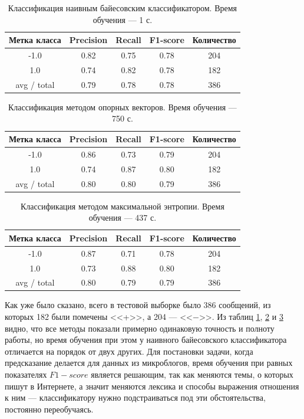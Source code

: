 \begin{table}[h]
    \centering
    \begin{tabular}{|c|c|c|c|c|}
      \hline
      \textbf{Метка класса} & \textbf{Precision} & \textbf{Recall} & \textbf{F1-score} &
      \textbf{Количество} \\ \hline
      -1.0&0.82&0.75&0.78&204\\ \hline
      1.0&0.74&0.82&0.78&182\\ \hline \hline
      avg / total&0.79&0.78&0.78&386\\
      \hline
    \end{tabular}
    \caption{Классификация наивным байесовским классификатором. Время обучения --- 1 с.}\label{tab:nb}
\end{table}
\begin{table}[h!]
    \centering
    \begin{tabular}{|c|c|c|c|c|}
      \hline
      \textbf{Метка класса} & \textbf{Precision} & \textbf{Recall} & \textbf{F1-score} &
      \textbf{Количество} \\ \hline
      -1.0&0.86&0.73&0.79&204\\ \hline
      1.0&0.74&0.87&0.80&182\\ \hline \hline
      avg / total&0.80&0.80&0.79&386\\
      \hline
    \end{tabular}
    \caption{Классификация методом опорных векторов. Время обучения --- 750 с.}\label{tab:svm}
\end{table}
\begin{table}[h!]
  \centering
    \begin{tabular}{|c|c|c|c|c|}
      \hline
      \textbf{Метка класса} & \textbf{Precision} & \textbf{Recall} & \textbf{F1-score} & \textbf{Количество} \\ \hline
      -1.0&0.87&0.71&0.78&204\\ \hline
      1.0&0.73&0.88&0.80&182\\ \hline \hline
      avg / total&0.80&0.79&0.79&386\\
      \hline
    \end{tabular}
    \caption{Классификация методом максимальной энтропии. Время обучения --- 437 с.}\label{tab:maxent}
\end{table}

Как уже было сказано, всего в тестовой выборке было 386 сообщений, из которых 182 были помечены
<<+>>, а 204 --- <<$\minus$>>. Из таблиц \ref{tab:nb}, \ref{tab:svm} и \ref{tab:maxent} видно, что все методы показали
примерно одинаковую точность и полноту работы, но время обучения при этом у наивного байесовского
классификатора отличается на порядок от двух других.  Для постановки задачи, когда предсказание делается для данных из
микроблогов, время обучения при равных показателях $F1-score$ является решающим, так как меняются
темы, о которых пишут в Интернете, а значит меняются лексика и способы выражения отношения к ним ---
классификатору нужно подстраиваться под эти обстоятельства, постоянно переобучаясь.

